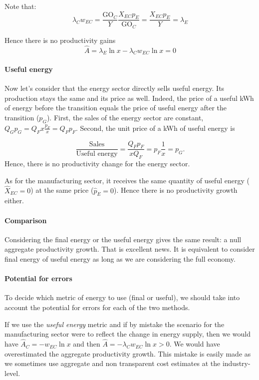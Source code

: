 Note that:
\begin{equation*}
    \lambda_Cw_{EC}=\frac{\text{GO}_C}{Y}\frac{X_{EC}p_E}{\text{GO}_C}=\frac{X_{EC}p_E}{Y}=\lambda_E
\end{equation*}

Hence there is no productivity gains
\begin{equation}
\label{eq_Ahat_WE}
\hat{A}=\lambda_E\ln{x}-\lambda_Cw_{EC}\ln{x}=0
\end{equation}

\paragraph{Useful energy} Now let's consider that the energy sector directly sells useful energy. Its production stays the same and its price as well. 
Indeed, the price of a useful kWh of energy before the transition equals the price of useful energy after the transition ($p_G$).
First, the sales of the energy sector are constant, $Q_Gp_G=Q_Fx\frac{p_F}{x}=Q_Fp_F$. Second, the unit price of a kWh of useful energy is


\begin{equation*}
    \frac{\text{Sales}}{\text{Useful energy}}=\frac{Q_F p_F}{xQ_F}=p_F\frac{1}{x}=p_G.
\end{equation*}
Hence, there is no productivity change for the energy sector. 

As for the manufacturing sector, it receives the same quantity of useful energy ($\hat{X}_{EC}=0$) at the same price ($\hat{p}_E=0$). Hence there is no productivity growth either. 

\paragraph{Comparison} Considering the final energy or the useful energy gives the same result: a null aggregate productivity growth. That is excellent news. It is equivalent to consider final energy of useful energy as long as we are considering the full economy. 

\paragraph{Potential for errors}
To decide which metric of energy to use (final or useful), we should take into account the potential for errors for each of the two methods. 

If we use the \textit{useful energy} metric and if by mistake the scenario for the manufacturing sector were to reflect the change in energy supply, then we would have $\hat{A}_C=-w_{EC}\ln{x}$ and then $\hat{A}=-\lambda_Cw_{EC}\ln{x}>0$. We would have overestimated the aggregate productivity growth. This mistake is easily made as we sometimes use aggregate and non transparent cost estimates at the industry-level.

